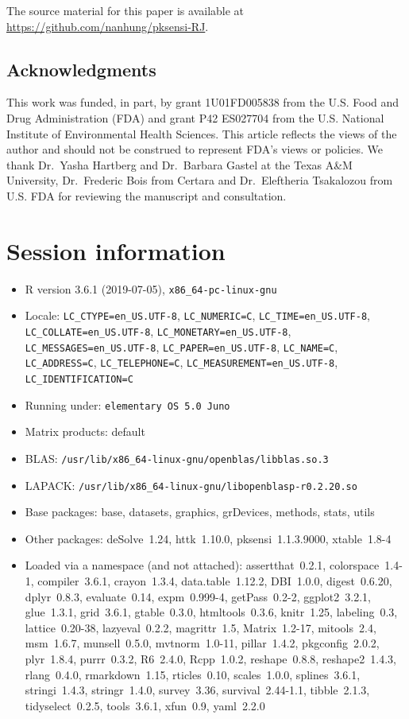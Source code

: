 The source material for this paper is available at
\url{https://github.com/nanhung/pksensi-RJ}.

\hypertarget{acknowledgments}{%
\subsection{Acknowledgments}\label{acknowledgments}}

This work was funded, in part, by grant 1U01FD005838 from the U.S. Food
and Drug Administration (FDA) and grant P42 ES027704 from the U.S.
National Institute of Environmental Health Sciences. This article
reflects the views of the author and should not be construed to
represent FDA's views or policies. We thank Dr.~Yasha Hartberg and
Dr.~Barbara Gastel at the Texas A\&M University, Dr.~Frederic Bois from
Certara and Dr.~Eleftheria Tsakalozou from U.S. FDA for reviewing the
manuscript and consultation.

\hypertarget{session-information}{%
\section{Session information}\label{session-information}}

\begin{itemize}\raggedright
  \item R version 3.6.1 (2019-07-05), \verb|x86_64-pc-linux-gnu|
  \item Locale: \verb|LC_CTYPE=en_US.UTF-8|, \verb|LC_NUMERIC=C|, \verb|LC_TIME=en_US.UTF-8|, \verb|LC_COLLATE=en_US.UTF-8|, \verb|LC_MONETARY=en_US.UTF-8|, \verb|LC_MESSAGES=en_US.UTF-8|, \verb|LC_PAPER=en_US.UTF-8|, \verb|LC_NAME=C|, \verb|LC_ADDRESS=C|, \verb|LC_TELEPHONE=C|, \verb|LC_MEASUREMENT=en_US.UTF-8|, \verb|LC_IDENTIFICATION=C|
  \item Running under: \verb|elementary OS 5.0 Juno|
  \item Matrix products: default
  \item BLAS:   \verb|/usr/lib/x86_64-linux-gnu/openblas/libblas.so.3|
  \item LAPACK: \verb|/usr/lib/x86_64-linux-gnu/libopenblasp-r0.2.20.so|
  \item Base packages: base, datasets, graphics, grDevices,
    methods, stats, utils
  \item Other packages: deSolve~1.24, httk~1.10.0,
    pksensi~1.1.3.9000, xtable~1.8-4
  \item Loaded via a namespace (and not attached):
    assertthat~0.2.1, colorspace~1.4-1, compiler~3.6.1,
    crayon~1.3.4, data.table~1.12.2, DBI~1.0.0, digest~0.6.20,
    dplyr~0.8.3, evaluate~0.14, expm~0.999-4, getPass~0.2-2,
    ggplot2~3.2.1, glue~1.3.1, grid~3.6.1, gtable~0.3.0,
    htmltools~0.3.6, knitr~1.25, labeling~0.3, lattice~0.20-38,
    lazyeval~0.2.2, magrittr~1.5, Matrix~1.2-17, mitools~2.4,
    msm~1.6.7, munsell~0.5.0, mvtnorm~1.0-11, pillar~1.4.2,
    pkgconfig~2.0.2, plyr~1.8.4, purrr~0.3.2, R6~2.4.0,
    Rcpp~1.0.2, reshape~0.8.8, reshape2~1.4.3, rlang~0.4.0,
    rmarkdown~1.15, rticles~0.10, scales~1.0.0, splines~3.6.1,
    stringi~1.4.3, stringr~1.4.0, survey~3.36, survival~2.44-1.1,
    tibble~2.1.3, tidyselect~0.2.5, tools~3.6.1, xfun~0.9,
    yaml~2.2.0
\end{itemize}

